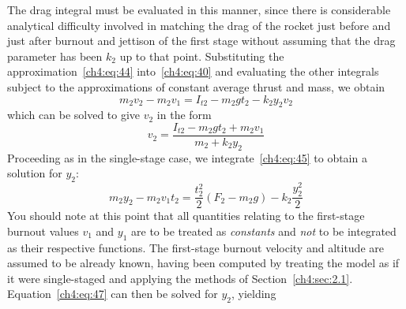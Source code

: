 The drag integral must be evaluated in this manner, since there is considerable analytical
difficulty involved in matching the drag of the rocket just before and just after burnout and
jettison of the first stage without assuming that the drag parameter has been $k_2$ up to that
point. Substituting the approximation~\eqref{ch4:eq:44} into~\eqref{ch4:eq:40} and evaluating the
other integrals subject to the approximations of constant average thrust and mass, we obtain
\begin{equation}\label{ch4:eq:45}
m_2v_2 - m_2v_1 = I_{t2} - m_2gt_2 - k_2y_2v_2
\end{equation}
which can be solved to give $v_2$ in the form
\begin{equation}\label{ch4:eq:46}
v_2 = \frac{I_{t2} - m_2gt_2 + m_2v_1}{m_2 + k_2y_2}
\end{equation}
Proceeding as in the single-stage case, we integrate~\eqref{ch4:eq:45} to obtain a solution for
$y_2$:
\begin{equation}\label{ch4:eq:47}
m_2y_2 - m_2v_1t_2 = \frac{t_2^{2}}{2}(F_2 - m_2g) - k_2\frac{y_2^{2}}{2}
\end{equation}
You should note at this point that all quantities relating to the first-stage burnout values $v_1$
and $y_1$ are to be treated as \emph{constants} and \emph{not} to be integrated as their respective
functions. The first-stage burnout velocity and altitude are assumed to be already known, having
been computed by treating the model as if it were single-staged and applying the methods of
Section~\ref{ch4:sec:2.1}. Equation~\eqref{ch4:eq:47} can then be solved for $y_2$,
yielding
